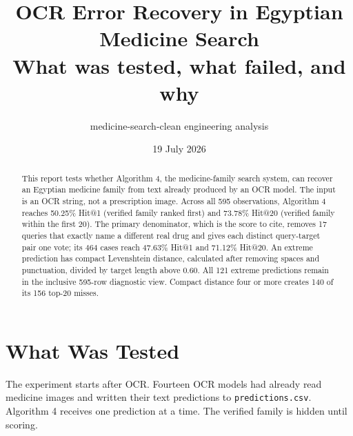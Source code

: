 \documentclass[11pt]{article}
\title{\textbf{OCR Error Recovery in Egyptian Medicine Search}\\
\large What was tested, what failed, and why}
\author{medicine-search-clean engineering analysis}
\date{19 July 2026}
\newcommand{\code}[1]{\texttt{#1}}
\begin{document}
\maketitle

\begin{abstract}
This report tests whether Algorithm 4, the medicine-family search system, can recover an Egyptian medicine family
from text already produced by an OCR model. The input is an OCR string, not a
prescription image. Across all 595 observations, Algorithm 4 reaches 50.25\%
Hit@1 (verified family ranked first) and 73.78\% Hit@20 (verified family within
the first 20). The primary denominator, which is the score to cite, removes 17
queries that exactly name a different real drug and gives each distinct
query-target pair one vote; its 464 cases reach 47.63\% Hit@1 and 71.12\%
Hit@20. An extreme prediction has compact Levenshtein distance, calculated
after removing spaces and punctuation, divided by target length above 0.60.
All 121 extreme predictions remain in the inclusive 595-row diagnostic view.
Compact distance four or more creates 140 of its 156 top-20 misses.
\end{abstract}

\section{What Was Tested}

The experiment starts after OCR. Fourteen OCR models had already read medicine
images and written their text predictions to \code{predictions.csv}. Algorithm 4
receives one prediction at a time. The verified family is hidden until scoring.
\end{document}
